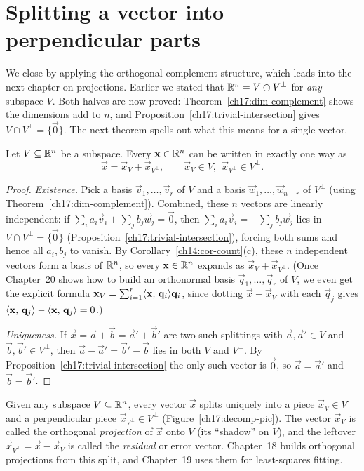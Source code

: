 \section{Splitting a vector into perpendicular parts}

We close by applying the orthogonal-complement structure, which leads into the next
chapter on projections. Earlier we stated that $\mathbb{R}^n = V\oplus V^\perp$
for \emph{any} subspace $V$. Both halves are now proved: Theorem~\ref{ch17:dim-complement} shows
the dimensions add to $n$, and Proposition~\ref{ch17:trivial-intersection} gives
$V\cap V^\perp=\{\vec0\}$. The next theorem spells out what this means for a single vector.

\begin{theorem}\label{ch17:orthog-decomp}
Let $V\subseteq\mathbb{R}^n$ be a subspace. Every $\mathbf{x}\in\mathbb{R}^n$ can be written in exactly one way as
\[
  \vec x = \vec x_V + \vec x_{V^\perp}, \qquad \vec x_V\in V,\ \ \vec x_{V^\perp}\in V^\perp .
\]
\end{theorem}

\begin{proof}
\emph{Existence.} Pick a basis $\vec{v}_1,\dots,\vec{v}_r$ of $V$ and a basis
$\vec{w}_1,\dots,\vec{w}_{n-r}$ of $V^\perp$ (using Theorem~\ref{ch17:dim-complement}). Combined,
these $n$ vectors are linearly independent: if $\sum_i a_i\vec{v}_i + \sum_j b_j\vec{w}_j = \vec{0}$,
then $\sum_i a_i\vec{v}_i = -\sum_j b_j\vec{w}_j$ lies in $V \cap V^\perp = \{\vec{0}\}$
(Proposition~\ref{ch17:trivial-intersection}), forcing both sums and hence all $a_i, b_j$ to vanish.
By Corollary~\ref{ch14:cor-count}(c), these $n$ independent vectors form a basis of $\mathbb{R}^n$, so every
$\mathbf{x}\in\mathbb{R}^n$ expands as $\vec{x}_V + \vec{x}_{V^\perp}$. (Once Chapter~20 shows how to build an
orthonormal basis $\vec{q}_1,\dots,\vec{q}_r$ of $V$, we even get the explicit formula
$\mathbf{x}_V=\sum_{i=1}^r\langle \mathbf{x},\, \mathbf{q}_i \rangle\mathbf{q}_i$, since dotting $\vec{x}-\vec{x}_V$ with
each $\vec{q}_j$ gives $\langle \mathbf{x},\, \mathbf{q}_j \rangle-\langle \mathbf{x},\, \mathbf{q}_j \rangle=0$.)

\emph{Uniqueness.} If $\vec x=\vec a+\vec b=\vec a'+\vec b'$ are two such splittings with
$\vec a,\vec a'\in V$ and $\vec b,\vec b'\in V^\perp$, then $\vec a-\vec a'=\vec b'-\vec b$ lies in
both $V$ and $V^\perp$. By Proposition~\ref{ch17:trivial-intersection} the only such vector is
$\vec 0$, so $\vec a=\vec a'$ and $\vec b=\vec b'$.
\end{proof}

\begin{intuitionbox}
Given any subspace $V \subseteq \mathbb{R}^n$, every vector $\vec{x}$ splits uniquely
into a piece $\vec{x}_V \in V$ and a perpendicular piece $\vec{x}_{V^\perp} \in V^\perp$
(Figure~\ref{ch17:decomp-pic}).
The vector $\vec{x}_V$ is called the orthogonal \emph{projection} of $\vec{x}$ onto $V$ (its
``shadow'' on $V$), and the leftover $\vec{x}_{V^\perp} = \vec{x} - \vec{x}_V$ is called the
\emph{residual} or error vector.
Chapter~18 builds orthogonal projections from this split, and Chapter~19 uses them for
least-squares fitting.
\end{intuitionbox}


